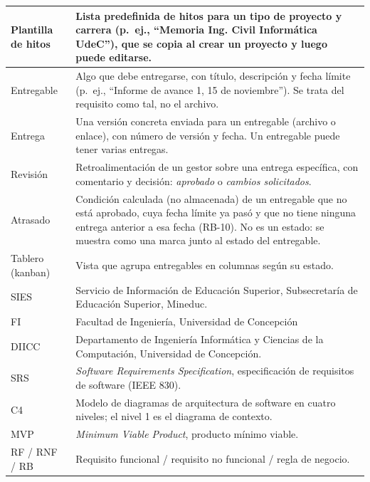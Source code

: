 \documentclass[10pt,a4paper]{article}
\begin{document}
\begin{xltabular}{\linewidth}{|P{4.6cm}|L|}
Plantilla de hitos & Lista predefinida de hitos para un tipo de proyecto y carrera (p.~ej., ``Memoria Ing. Civil Informática UdeC''), que se copia al crear un proyecto y luego puede editarse. \\ \hline
Entregable & Algo que debe entregarse, con título, descripción y fecha límite (p.~ej., ``Informe de avance 1, 15 de noviembre''). Se trata del requisito como tal, no el archivo. \\ \hline
Entrega & Una versión concreta enviada para un entregable (archivo o enlace), con número de versión y fecha. Un entregable puede tener varias entregas. \\ \hline
Revisión & Retroalimentación de un gestor sobre una entrega específica, con comentario y decisión: \emph{aprobado} o \emph{cambios solicitados}. \\ \hline
Atrasado & Condición calculada (no almacenada) de un entregable que no está aprobado, cuya fecha límite ya pasó y que no tiene ninguna entrega anterior a esa fecha (RB-10). No es un estado: se muestra como una marca junto al estado del entregable. \\ \hline
Tablero (kanban) & Vista que agrupa entregables en columnas según su estado. \\ \hline
SIES & Servicio de Información de Educación Superior, Subsecretaría de Educación Superior, Mineduc. \\ \hline
FI & Facultad de Ingeniería, Universidad de Concepción \\ \hline
DIICC & Departamento de Ingeniería Informática y Ciencias de la Computación, Universidad de Concepción. \\ \hline
SRS & \emph{Software Requirements Specification}, especificación de requisitos de software (IEEE 830). \\ \hline
C4 & Modelo de diagramas de arquitectura de software en cuatro niveles; el nivel 1 es el diagrama de contexto. \\ \hline
MVP & \emph{Minimum Viable Product}, producto mínimo viable. \\ \hline
RF / RNF / RB & Requisito funcional / requisito no funcional / regla de negocio. \\ \hline
\end{xltabular}

\newpage
\end{document}
